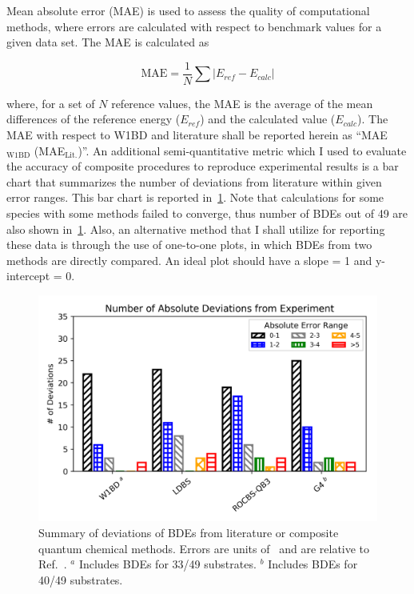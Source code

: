 

Mean absolute error (MAE) is used to assess the quality of computational
methods, where errors are calculated with respect to benchmark values for a
given data set.\cite{Savin2014} The MAE is calculated as

\begin{equation}
  \mathrm{MAE} = \frac{1}{N} \sum | E_{ref} - E_{calc}|
\end{equation}

\noindent where, for a set of $N$ reference values, the MAE is the average of
the mean differences of the reference energy ($E_{ref}$) and the calculated
value ($E_{calc}$). The MAE with respect to W1BD and literature shall be
reported herein as ``MAE$_{\mathrm{W1BD}}$ (MAE$_{\mathrm{Lit.}}$)''. An
additional semi-quantitative metric which I used to evaluate the accuracy of
composite procedures to reproduce experimental results is a bar chart that
summarizes the number of deviations from literature within given error ranges.
This bar chart is reported in~\ref{fig:maebarchart}. Note that calculations for
some species with some methods failed to converge, thus number of BDEs out of
49 are also shown in~\ref{fig:maebarchart}. Also, an alternative method that I
shall utilize for reporting these data is through the use of one-to-one plots,
in which BDEs from two methods are directly compared. An ideal plot should have
a slope = 1 and y-intercept = 0.

\begin{figure}[!htbp]
  \centering
  \includegraphics[width=\textwidth]{figures/bde-barchart}
  \caption[Summary of deviations of BDEs from literature for composite quantum
  chemical methods.]{Summary of deviations of BDEs from literature or composite
  quantum chemical methods. Errors are units of \kcalmol\ and are relative to
  Ref.~\protect{}. $^a$ Includes BDEs for 33/49 substrates. $^b$
  Includes BDEs for 40/49 substrates.} \label{fig:maebarchart}
\end{figure}

